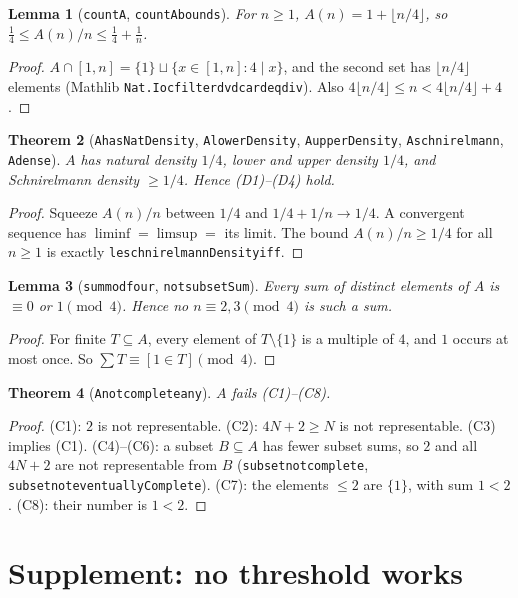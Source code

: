 \documentclass[11pt]{article}
\newtheorem{theorem}{Theorem}
\newtheorem{lemma}[theorem]{Lemma}
\theoremstyle{definition}
\renewcommand{\_}{\oldus\allowbreak}
\begin{document}
\begin{lemma}[\texttt{count\_A}, \texttt{count\_A\_bounds}]
For $n\ge1$, $A(n)=1+\lfloor n/4\rfloor$, so $\tfrac14\le A(n)/n\le\tfrac14+\tfrac1n$.
\end{lemma}
\begin{proof}
$A\cap[1,n]=\{1\}\sqcup\{x\in[1,n]:4\mid x\}$, and the second set has $\lfloor n/4\rfloor$ elements
(Mathlib \texttt{Nat.Ioc\_filter\_dvd\_card\_eq\_div}). Also $4\lfloor n/4\rfloor\le n<4\lfloor
n/4\rfloor+4$.
\end{proof}

\begin{theorem}[\texttt{A\_hasNatDensity}, \texttt{A\_lowerDensity}, \texttt{A\_upperDensity},
\texttt{A\_schnirelmann}, \texttt{A\_dense}]
$A$ has natural density $1/4$, lower and upper density $1/4$, and Schnirelmann density $\ge1/4$.
Hence (D1)--(D4) hold.
\end{theorem}
\begin{proof}
Squeeze $A(n)/n$ between $1/4$ and $1/4+1/n\to1/4$. A convergent sequence has $\liminf=\limsup=$ its limit.
The bound $A(n)/n\ge1/4$ for all $n\ge1$ is exactly \texttt{le\_schnirelmannDensity\_iff}.
\end{proof}

\begin{lemma}[\texttt{sum\_mod\_four}, \texttt{not\_subsetSum}]
Every sum of distinct elements of $A$ is $\equiv0$ or $1\pmod4$. Hence no $n\equiv2,3\pmod 4$ is such a
sum.
\end{lemma}
\begin{proof}
For finite $T\subseteq A$, every element of $T\setminus\{1\}$ is a multiple of $4$, and $1$ occurs at most
once. So $\sum T\equiv[1\in T]\pmod 4$.
\end{proof}

\begin{theorem}[\texttt{A\_not\_complete\_any}]
$A$ fails (C1)--(C8).
\end{theorem}
\begin{proof}
(C1): $2$ is not representable. (C2): $4N+2\ge N$ is not representable. (C3) implies (C1). (C4)--(C6):
a subset $B\subseteq A$ has fewer subset sums, so $2$ and all $4N+2$ are not representable from $B$
(\texttt{subset\_not\_complete}, \texttt{subset\_not\_eventuallyComplete}). (C7): the elements $\le2$
are $\{1\}$, with sum $1<2$. (C8): their number is $1<2$.
\end{proof}

\section{Supplement: no threshold works}\label{sec:supp}
\end{document}
